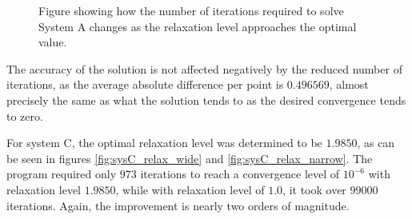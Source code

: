 \begin{figure}[h!]
\centering
\setlength\fboxsep{0pt}
\setlength\fboxrule{0.5pt}
\label{fig:relax_narrow}
\caption{Figure showing how the number of iterations required to solve System A changes as the relaxation level approaches the optimal value.}
\end{figure}

The accuracy of the solution is not affected negatively by the reduced number of iterations, as the average absolute difference per point is $0.496569$, almost precisely the same as what the solution tends to as the desired convergence tends to zero.

For system C, the optimal relaxation level was determined to be $1.9850$, as can be seen in figures \ref{fig:sysC_relax_wide} and \ref{fig:sysC_relax_narrow}. The program required only $973$ iterations to reach a convergence level of $10^{-6}$ with relaxation level $1.9850$, while with relaxation level of $1.0$, it took over $99000$ iterations. Again, the improvement is nearly two orders of magnitude.

